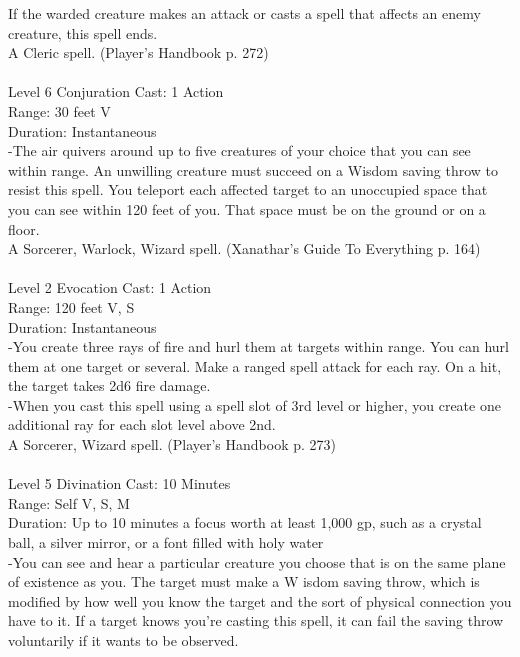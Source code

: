 \documentclass[10pt,twocolumn]{report}
\begin{document}
If the warded creature makes an attack or casts a spell that affects an enemy creature, this spell ends.\\
A Cleric spell. (Player's Handbook p. 272) \\


 \\
Level 6 \quad Conjuration \quad Cast: 1 Action\\
Range: 30 feet \quad V\\
Duration: Instantaneous \quad \\
-The air quivers around up to five creatures of your choice that you can see within range. An unwilling creature must succeed on a Wisdom saving throw to resist this spell. You teleport each affected target to an unoccupied space that you can see within 120 feet of you. That space must be on the ground or on a floor.\\
A Sorcerer, Warlock, Wizard spell. (Xanathar's Guide To Everything p. 164) \\


 \\
Level 2 \quad Evocation \quad Cast: 1 Action\\
Range: 120 feet \quad V, S\\
Duration: Instantaneous \quad \\
-You create three rays of fire and hurl them at targets within range. You can hurl them at one target or several. Make a ranged spell attack for each ray. On a hit, the target takes 2d6 fire damage.\\
-When you cast this spell using a spell slot of 3rd level or higher, you create one additional ray for each slot level above 2nd.\\
A Sorcerer, Wizard spell. (Player's Handbook p. 273) \\


 \\
Level 5 \quad Divination \quad Cast: 10 Minutes\\
Range: Self \quad V, S, M\\
Duration: Up to 10 minutes \quad a focus worth at least 1,000 gp, such as a crystal ball, a silver mirror, or a font filled with holy water\\
-You can see and hear a particular creature you choose that is on the same plane of existence as you. The target must make a W isdom saving throw, which is modified by how well you know the target and the sort of physical connection you have to it. If a target knows you’re casting this spell, it can fail the saving throw voluntarily if it wants to be observed.
\end{document}
